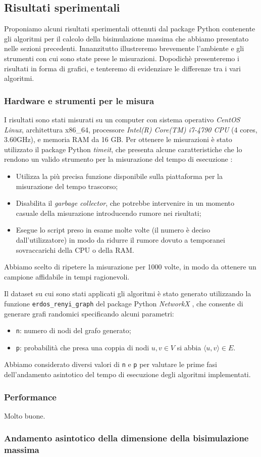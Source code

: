 \subsection{Risultati sperimentali}
Proponiamo alcuni risultati sperimentali ottenuti dal package Python contenente gli algoritmi per il calcolo della bisimulazione massima che abbiamo presentato nelle sezioni precedenti. Innanzitutto illustreremo brevemente l'ambiente e gli strumenti con cui sono state prese le misurazioni. Dopodichè presenteremo i risultati in forma di grafici, e tenteremo di evidenziare le differenze tra i vari algoritmi.

\subsubsection{Hardware e strumenti per le misura}
I risultati sono stati misurati su un computer con sistema operativo \emph{CentOS Linux}, architettura x86\_64, processore \emph{Intel(R) Core(TM) i7-4790 CPU} (4 cores, 3.60GHz), e memoria RAM da 16 GB. Per ottenere le misurazioni è stato utilizzato il package Python \emph{timeit}, che presenta alcune caratteristiche che lo rendono un valido strumento per la misurazione del tempo di esecuzione \cite{pythondocs}:
\begin{itemize}
    \item Utilizza la più precisa funzione disponibile sulla piattaforma per la misurazione del tempo trascorso;
    \item Disabilita il \emph{garbage collector}, che potrebbe intervenire in un momento casuale della misurazione introducendo rumore nei risultati;
    \item Esegue lo script preso in esame molte volte (il numero è deciso dall'utilizzatore) in modo da ridurre il rumore dovuto a temporanei sovraccarichi della CPU o della RAM.
\end{itemize}
Abbiamo scelto di ripetere la misurazione per 1000 volte, in modo da ottenere un campione affidabile in tempi ragionevoli.

Il dataset su cui sono stati applicati gli algoritmi è stato generato utilizzando la funzione \verb|erdos_renyi_graph| del package Python \emph{NetworkX} \cite{networkx}, che consente di generare grafi randomici specificando alcuni parametri:
\begin{itemize}
    \item \verb|n|: numero di nodi del grafo generato;
    \item \verb|p|: probabilità che presa una coppia di nodi $u,v \in V$ si abbia $\langle u,v\rangle \in E$.
\end{itemize}
Abbiamo considerato diversi valori di \verb|n| e \verb|p| per valutare le prime fasi dell'andamento asintotico del tempo di esecuzione degli algoritmi implementati.

\subsubsection{Performance}
Molto buone.

\subsubsection{Andamento asintotico della dimensione della bisimulazione massima}
